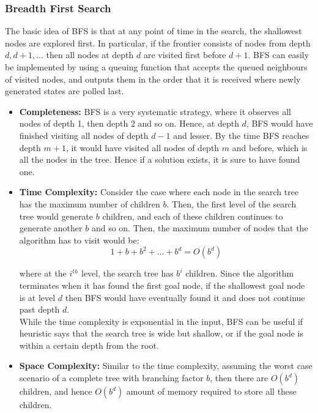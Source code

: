 \documentclass[12pt]{article}
\begin{document}
\subsubsection{Breadth First Search}

The basic idea of BFS is that at any point of time in the search, the shallowest nodes are explored first. In particular, if the frontier consists of nodes from depth $d, d + 1,...$ then all nodes at depth $d$ are visited first before $d + 1$. BFS can easily be implemented by using a queuing function that accepts the queued neighbours of visited nodes, and outputs them in the order that it is received where newly generated states are polled last.\\

\begin{itemize}
\item \textbf{Completeness:} BFS is a very systematic strategy, where it observes all nodes of depth 1, then depth 2 and so on. Hence, at depth $d$, BFS would have finished visiting all nodes of depth $d-1$ and lesser. By the time BFS reaches depth $m + 1$, it would have visited all nodes of depth $m$ and before, which is all the nodes in the tree. Hence if a solution exists, it is sure to have found one.

\item \textbf{Time Complexity:} Consider the case where each node in the search tree has the maximum number of children $b$. Then, the first level of the search tree would generate $b$ children, and each of these children continues to generate another $b$ and so on. Then, the maximum number of nodes that the algorithm has to visit would be:
\begin{equation*}
1 + b + b^2 + ... + b^d = O(b^d)
\end{equation*}

where at the $i^{th}$ level, the search tree has $b^i$ children. Since the algorithm terminates when it has found the first goal node, if the shallowest goal node is at level $d$ then BFS would have eventually found it and does not continue past depth $d$.\\

While the time complexity is exponential in the input, BFS can be useful if heuristic says that the search tree is wide but shallow, or if the goal node is within a certain depth from the root.

\item \textbf{Space Complexity:} Similar to the time complexity, assuming the worst case scenario of a complete tree with branching factor $b$, then there are $O(b^d)$ children, and hence $O(b^d)$ amount of memory required to store all these children.


\end{itemize}
\end{document}
